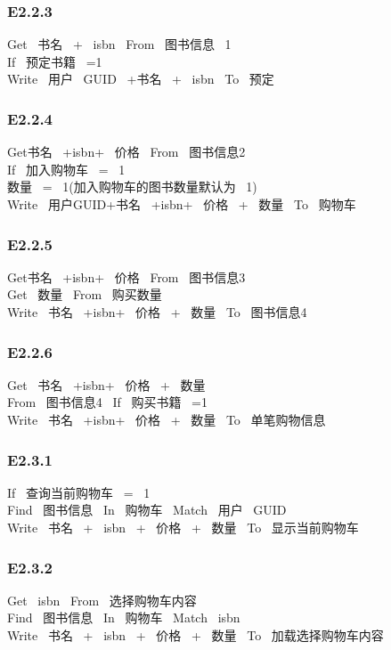 \subsubsection*{E2.2.3}
Get \ 书名 \ + \ isbn \ From \ 图书信息 \ 1 \\ 
If \ 预定书籍 \ =1\\ 
Write \ 用户 \ GUID \ +书名 \ + \ isbn \ To \ 预定\\ 
\vspace{-1mm}
\subsubsection*{E2.2.4}
Get书名 \ +isbn+ \ 价格 \ From \ 图书信息2 \\ 
If \ 加入购物车 \ = \ 1\\ 
数量 \ = \ 1(加入购物车的图书数量默认为 \ 1)\\ 
Write \ 用户GUID+书名 \ +isbn+ \ 价格 \ + \ 数量 \ To \ 购物车\\ 
\vspace{-1mm}
\subsubsection*{E2.2.5}
Get书名 \ +isbn+ \ 价格 \ From \ 图书信息3\\ 
Get \ 数量 \ From \ 购买数量\\ 
Write \ 书名 \ +isbn+ \ 价格 \ + \ 数量 \ To \ 图书信息4\\ 
\vspace{-1mm}
\subsubsection*{E2.2.6}
Get \ 书名 \ +isbn+ \ 价格 \ + \ 数量\\ 
From \ 图书信息4 \ If \ 购买书籍 \ =1\\ 
Write \ 书名 \ +isbn+ \ 价格 \ + \ 数量 \ To \ 单笔购物信息\\ 
\vspace{-1mm}
\subsubsection*{E2.3.1}
If \ 查询当前购物车 \ = \ 1\\ 
Find \ 图书信息 \ In \ 购物车 \ Match \ 用户 \ GUID\\ 
Write \ 书名 \ + \ isbn \ + \ 价格 \ + \ 数量 \ To \ 显示当前购物车\\ 
\vspace{-1mm}
\subsubsection*{E2.3.2}
Get \ isbn \ From \ 选择购物车内容\\ 
Find \ 图书信息 \ In \ 购物车 \ Match \ isbn\\ 
Write \ 书名 \ + \ isbn \ + \ 价格 \ + \ 数量 \ To \ 加载选择购物车内容\\ 
\vspace{-1mm}

